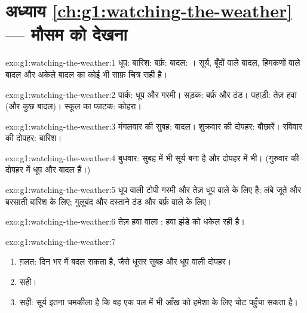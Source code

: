 \section*{अध्याय \ref{ch:g1:watching-the-weather} --- मौसम को देखना}

\begin{solution}{exo:g1:watching-the-weather:1}
धूप: \quad बारिश: \quad बर्फ़: \quad
बादल: । सूर्य, बूँदों वाले बादल, हिमकणों वाले बादल और अकेले
बादल का कोई भी साफ़ चित्र सही है।
\end{solution}

\begin{solution}{exo:g1:watching-the-weather:2}
पार्क: धूप और गरमी। सड़क: बर्फ़ और ठंड। पहाड़ी: तेज़ हवा (और कुछ बादल)।
स्कूल का फाटक: कोहरा।
\end{solution}

\begin{solution}{exo:g1:watching-the-weather:3}
मंगलवार की सुबह: बादल। शुक्रवार की दोपहर: बौछारें। रविवार की दोपहर:
बारिश।
\end{solution}

\begin{solution}{exo:g1:watching-the-weather:4}
बुधवार: सुबह में भी सूर्य बना है और दोपहर में भी। (गुरुवार की दोपहर में
धूप और बादल हैं।)
\end{solution}

\begin{solution}{exo:g1:watching-the-weather:5}
धूप वाली टोपी गरमी और तेज़ धूप वाले  के लिए है; लंबे जूते और बरसाती
बारिश के लिए; गुलूबंद और दस्ताने ठंड और बर्फ़ वाले  के लिए।
\end{solution}

\begin{solution}{exo:g1:watching-the-weather:6}
तेज़ हवा वाला : हवा झंडे को धकेल रही है।
\end{solution}

\begin{solution}{exo:g1:watching-the-weather:7}
\begin{enumerate}
  \item ग़लत: दिन भर में  बदल सकता है, जैसे धूसर सुबह और धूप वाली
        दोपहर।
  \item सही।
  \item सही: सूर्य इतना चमकीला है कि वह एक पल में भी आँख को हमेशा के लिए
        चोट पहुँचा सकता है।
\end{enumerate}
\end{solution}


